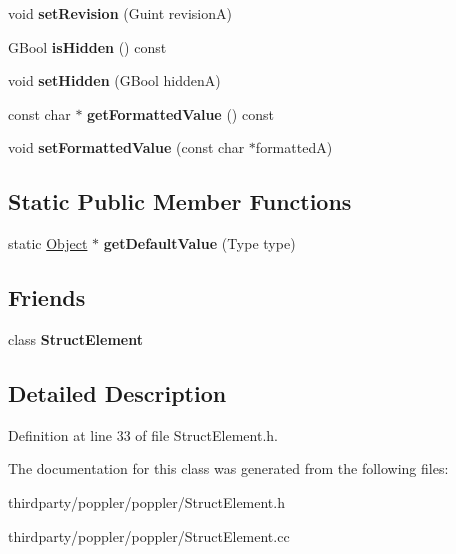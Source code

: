 \begin{DoxyCompactItemize}
\item 
\mbox{\label{class_attribute_abfef160516f43138f4974d017b3fe6ef}} 
void {\bfseries set\+Revision} (Guint revisionA)
\item 
\mbox{\label{class_attribute_a3e79730bf7492802c19a817e7a79c1c0}} 
G\+Bool {\bfseries is\+Hidden} () const
\item 
\mbox{\label{class_attribute_aa72b893d562e33f2c54b245a64048ebb}} 
void {\bfseries set\+Hidden} (G\+Bool hiddenA)
\item 
\mbox{\label{class_attribute_a32070462cf41ae68ae394859bc817526}} 
const char $\ast$ {\bfseries get\+Formatted\+Value} () const
\item 
\mbox{\label{class_attribute_a1e821a4e43077a97d4590a95a5365ceb}} 
void {\bfseries set\+Formatted\+Value} (const char $\ast$formattedA)
\end{DoxyCompactItemize}
\subsection*{Static Public Member Functions}
\begin{DoxyCompactItemize}
\item 
\mbox{\label{class_attribute_ab260949a9f2825d5c52aa7a92887e6a6}} 
static \hyperlink{class_object}{Object} $\ast$ {\bfseries get\+Default\+Value} (Type type)
\end{DoxyCompactItemize}
\subsection*{Friends}
\begin{DoxyCompactItemize}
\item 
\mbox{\label{class_attribute_a7a4d9df96fb1ef7629bbdf8df0880da9}} 
class {\bfseries Struct\+Element}
\end{DoxyCompactItemize}


\subsection{Detailed Description}


Definition at line 33 of file Struct\+Element.\+h.



The documentation for this class was generated from the following files\+:\begin{DoxyCompactItemize}
\item 
thirdparty/poppler/poppler/Struct\+Element.\+h\item 
thirdparty/poppler/poppler/Struct\+Element.\+cc\end{DoxyCompactItemize}
